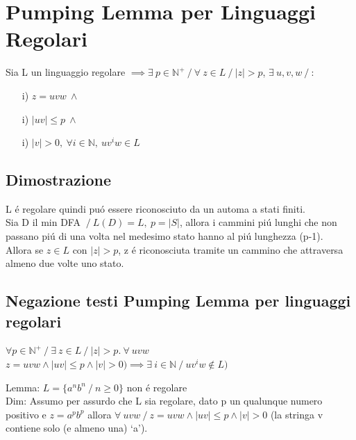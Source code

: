 \section{Pumping Lemma per Linguaggi Regolari}

Sia L un linguaggio regolare
$\implies \exists\ p \in \mathbb{N}^+ \ / \ \forall\ z \in L \ / \ |z| > p$,
$\exists\ u,v,w \ / \ $:

\begin{itemize}
    \item[i)] $z = uvw\ \land$\\
    \item[i)] $|uv| \leq p\ \land$\\
    \item[i)] $|v| > 0,\ \forall i \in \mathbb{N},\ u v^i w \in L$\\
\end{itemize}

\subsection{Dimostrazione}
L \'e regolare quindi pu\'o essere riconosciuto da un automa a stati finiti.\\
Sia D il min DFA $\ / \ L(D) = L,\ p = |S|$, allora i cammini pi\'u lunghi che non passano pi\'u di una volta nel medesimo 
stato hanno al pi\'u lunghezza (p-1).\\
Allora se $z \in L$ con $|z|>p$, z \'e riconosciuta tramite un cammino che attraversa almeno due volte uno stato. \\

\subsection{Negazione testi Pumping Lemma per linguaggi regolari}
$\forall p \in \mathbb{N}^+ \ / \ \exists\ z \in L \ / \ |z| > p.\ \forall\ uvw $
$z = uvw \land |uv| \leq p \land |v| > 0) \implies \exists\ i \in \mathbb{N} \ / \ u v^i w \not\in L) $

Lemma: $L=\{a^nb^n \ / \ n \geq 0\}$ non \'e regolare\\
Dim: Assumo per assurdo che L sia regolare, dato p un qualunque numero positivo e $z= a^p b^p $ allora
$\forall\ uvw \ / \ z = uvw \land |uv| \leq p \land |v| > 0$ (la stringa v contiene solo (e almeno una) \lq a\rq ).

